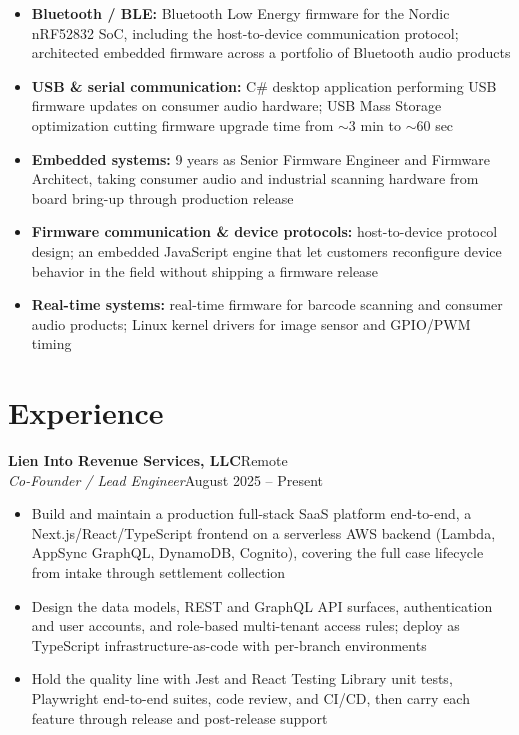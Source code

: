 \documentclass[10.5pt, letterpaper]{article}
\newcommand{\jobentry}[4]{%
  \noindent
  \textbf{\color{accent}#1}\hfill\textcolor{muted}{\small #2}\\
  \textit{#3}\hfill\textcolor{muted}{\small #4}%
}
\begin{document}
\begin{itemize}
  \item \textbf{Bluetooth / BLE:} Bluetooth Low Energy firmware for the Nordic
        nRF52832 SoC, including the host-to-device communication protocol;
        architected embedded firmware across a portfolio of Bluetooth audio products
  \item \textbf{USB \& serial communication:} C\# desktop application performing USB
        firmware updates on consumer audio hardware; USB Mass Storage optimization
        cutting firmware upgrade time from $\sim$3 min to $\sim$60 sec
  \item \textbf{Embedded systems:} 9 years as Senior Firmware Engineer and Firmware
        Architect, taking consumer audio and industrial scanning hardware from
        board bring-up through production release
  \item \textbf{Firmware communication \& device protocols:} host-to-device protocol
        design; an embedded JavaScript engine that let customers reconfigure device
        behavior in the field without shipping a firmware release
  \item \textbf{Real-time systems:} real-time firmware for barcode scanning and
        consumer audio products; Linux kernel drivers for image sensor and
        GPIO/PWM timing
\end{itemize}

\section{Experience}

\jobentry{Lien Into Revenue Services, LLC}{Remote}{Co-Founder / Lead Engineer}{August 2025 -- Present}
\begin{itemize}
  \item Build and maintain a production full-stack SaaS platform end-to-end, a
        Next.js/React/TypeScript frontend on a serverless AWS backend (Lambda,
        AppSync GraphQL, DynamoDB, Cognito), covering the full case lifecycle
        from intake through settlement collection
  \item Design the data models, REST and GraphQL API surfaces, authentication and
        user accounts, and role-based multi-tenant access rules; deploy as
        TypeScript infrastructure-as-code with per-branch environments
  \item Hold the quality line with Jest and React Testing Library unit tests,
        Playwright end-to-end suites, code review, and CI/CD, then carry each
        feature through release and post-release support
\end{itemize}
\end{document}
